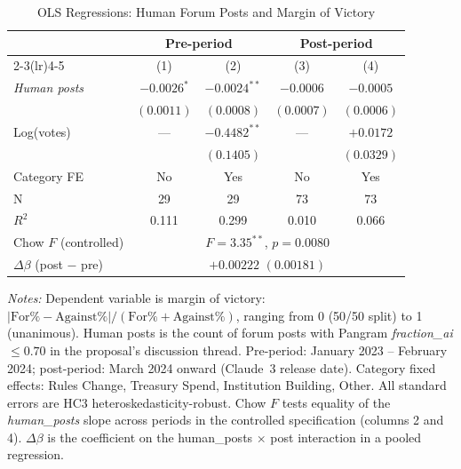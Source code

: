 \begin{table}[H]
\centering
\caption{OLS Regressions: Human Forum Posts and Margin of Victory}
\label{tab:ols_structural_break}
\small
\begin{tabular}{lcccc}
\toprule
 & \multicolumn{2}{c}{Pre-period} & \multicolumn{2}{c}{Post-period} \\
\cmidrule(lr){2-3}\cmidrule(lr){4-5}
 & (1) & (2) & (3) & (4) \\
\midrule
\textit{Human posts} & $-0.0026^{*}$ & $-0.0024^{**}$ & $-0.0006$ & $-0.0005$ \\
 & $(0.0011)$ & $(0.0008)$ & $(0.0007)$ & $(0.0006)$ \\
\addlinespace[2pt]
Log(votes) & --- & $-0.4482^{**}$ & --- & $+0.0172$ \\
 &  & $(0.1405)$ &  & $(0.0329)$ \\
\addlinespace[2pt]
\midrule
Category FE & No & Yes & No & Yes \\
N & 29 & 29 & 73 & 73 \\
$R^2$ & 0.111 & 0.299 & 0.010 & 0.066 \\
\midrule
Chow $F$ (controlled) & \multicolumn{4}{c}{$F = 3.35^{**}$, $p = 0.0080$} \\
$\Delta\beta$ (post $-$ pre) & \multicolumn{4}{c}{$+0.00222$ $(0.00181)$} \\
\bottomrule
\end{tabular}
\begin{minipage}{\linewidth}
\smallskip
\footnotesize
\textit{Notes:} Dependent variable is margin of victory: $|\text{For\%} - \text{Against\%}| / (\text{For\%} + \text{Against\%})$, ranging from 0 (50/50 split) to 1 (unanimous). Human posts is the count of forum posts with Pangram \textit{fraction\_ai} $\leq 0.70$ in the proposal's discussion thread. Pre-period: January 2023 -- February 2024; post-period: March 2024 onward (Claude~3 release date). Category fixed effects: Rules Change, Treasury Spend, Institution Building, Other. All standard errors are HC3 heteroskedasticity-robust. Chow $F$ tests equality of the \textit{human\_posts} slope across periods in the controlled specification (columns 2 and 4). $\Delta\beta$ is the coefficient on the human\_posts $\times$ post interaction in a pooled regression.
\end{minipage}
\end{table}